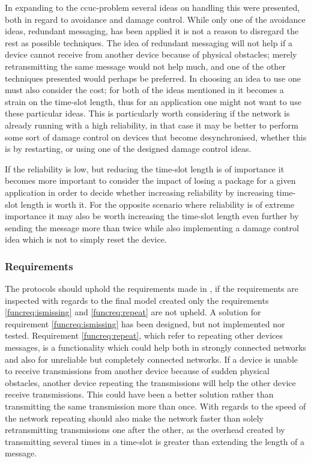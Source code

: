 In expanding to the \gls{ccuc}-problem several ideas on handling this were presented, both in regard to avoidance and damage control.
While only one of the avoidance ideas, redundant messaging, has been applied it is not a reason to disregard the rest as possible techniques.
The idea of redundant messaging will not help if a device cannot receive from another device because of physical obstacles; merely retransmitting the same message would not help much, and one of the other techniques presented would perhaps be preferred.
In choosing an idea to use one must also consider the cost; for both of the ideas mentioned in  it becomes a strain on the time-slot length, thus for an application one might not want to use these particular ideas.
This is particularly worth considering if the network is already running with a high reliability, in that case it may be better to perform some sort of damage control on devices that become desynchronised, whether this is by restarting, or using one of the designed damage control ideas. 

If the reliability is low, but reducing the time-slot length is of importance it becomes more important to consider the impact of losing a package for a given application in order to decide whether increasing reliability by increasing time-slot length is worth it.
For the opposite scenario where reliability is of extreme importance it may also be worth increasing the time-slot length even further by sending the message more than twice while also implementing a damage control idea which is not to simply reset the device.

\subsubsection{Requirements}
The protocols should uphold the requirements made in , if the requirements are inspected with regards to the final model created only the requirements \ref{funcreq:ismissing} and \ref{funcreq:repeat} are not upheld. 
A solution for requirement \ref{funcreq:ismissing} has been designed, but not implemented nor tested.
Requirement \ref{funcreq:repeat}, which refer to repeating other devices messages, is a functionality which could help both in strongly connected networks and also for unreliable but completely connected networks.
If a device is unable to receive transmissions from another device because of sudden physical obstacles, another device repeating the transmissions will help the other device receive transmissions.
This could have been a better solution rather than transmitting the same transmission more than once.
With regards to the speed of the network repeating should also make the network faster than solely retransmitting transmissions one after the other, as the overhead created by transmitting several times in a time-slot is greater than extending the length of a message.

